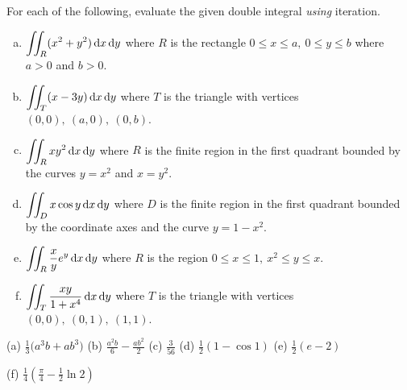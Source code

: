 \subsection*{\Procedural}


\begin{question} \label{prob_s3.1a}
For each of the following, evaluate the given double integral 
\emph{using} iteration.
\begin{enumerate}[(a)]
\item 
$\displaystyle\iint_R (x^2+y^2)\,\mathrm{d}x\,\mathrm{d}y$ where $R$ is the rectangle 
$0\le x\le a,\ 0\le y\le b$ where $a>0$ and $b>0$.
\item
$\displaystyle\iint_T (x-3y)\,\mathrm{d}x\,\mathrm{d}y$ where $T$ is the triangle 
with vertices $(0,0),\ (a,0),\ (0,b)$.
\item
$\displaystyle\iint_R xy^2\,\mathrm{d}x\,\mathrm{d}y$ where $R$ is the finite 
region in the first quadrant bounded by the curves $y=x^2$ and $x=y^2$.
\item 
$\displaystyle\iint_D x\cos y\,\mathrm{d}x\,\mathrm{d}y$ where $D$ is 
the finite region in the first quadrant bounded by the coordinate axes 
and the curve $y=1-x^2$.
\item
$\displaystyle\iint_R {x\over y}e^y\,\mathrm{d}x\,\mathrm{d}y$ where $R$ is 
the region $0\le x\le 1,\ x^2\le y\le x$.
\item
$\displaystyle\iint_T {xy\over 1+x^4}\,\mathrm{d}x\,\mathrm{d}y$  where $T$ 
is the triangle with vertices $(0,0),\ (0,1),\ (1,1)$.
\end{enumerate}
\end{question}

%

\begin{answer}
(a) $\frac{1}{3}\big(a^3b+ab^3\big)$ \qquad
(b) $\frac{a^2b}{6}-\frac{ab^2}{2}$  \qquad
(c) $\frac{3}{56}$ \qquad
(d) $\frac{1}{2}(1-\cos 1)$ \qquad
(e) $\frac{1}{2}(e-2)$  

(f) $\frac{1}{4}\left(\frac{\pi}{4}-\frac{1}{2}\ln 2\right)$ 
\end{answer}

